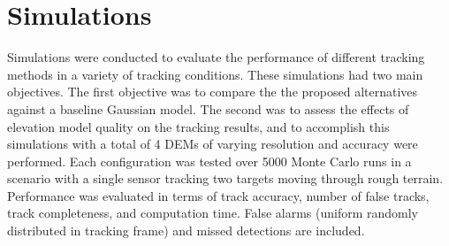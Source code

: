 \documentclass[journal]{IEEEtran}
\begin{document}






\section{Simulations} \label{simulations}
Simulations were conducted to evaluate the performance of different tracking methods in a variety of tracking conditions. These simulations had two main objectives. The first objective was to compare the the proposed alternatives against a baseline Gaussian model. The second was to assess the effects of elevation model quality on the tracking results, and to accomplish this simulations with a total of 4 DEMs of varying resolution and accuracy were performed. Each configuration was tested over 5000 Monte Carlo runs in a scenario with a single sensor tracking two targets moving through rough terrain. Performance was evaluated in terms of track accuracy, number of false tracks, track completeness, and computation time. False alarms (uniform randomly distributed in tracking frame) and missed detections are included.
\end{document}
